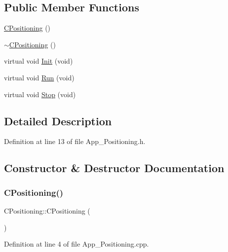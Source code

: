 \subsection*{Public Member Functions}
\begin{DoxyCompactItemize}
\item 
\mbox{\hyperlink{class_c_positioning_a2ef1dd3d4755b30ac7b800876de70869}{C\+Positioning}} ()
\item 
\mbox{\hyperlink{class_c_positioning_a2d1846176104d85f119010a471f6483d}{$\sim$\+C\+Positioning}} ()
\item 
virtual void \mbox{\hyperlink{class_c_positioning_abdceba66e701554a178acf61c61b0df6}{Init}} (void)
\item 
virtual void \mbox{\hyperlink{class_c_positioning_ad0e439dcc95c450548c2806077aeff57}{Run}} (void)
\item 
virtual void \mbox{\hyperlink{class_c_positioning_a2706c9bb6bb52201c279386fd2c9dd89}{Stop}} (void)
\end{DoxyCompactItemize}


\subsection{Detailed Description}


Definition at line 13 of file App\+\_\+\+Positioning.\+h.



\subsection{Constructor \& Destructor Documentation}
\mbox{\label{class_c_positioning_a2ef1dd3d4755b30ac7b800876de70869}} 
\subsubsection{\texorpdfstring{C\+Positioning()}{CPositioning()}}
{\footnotesize\ttfamily C\+Positioning\+::\+C\+Positioning (\begin{DoxyParamCaption}{ }\end{DoxyParamCaption})}



Definition at line 4 of file App\+\_\+\+Positioning.\+cpp.

\mbox{\label{class_c_positioning_a2d1846176104d85f119010a471f6483d}} 
